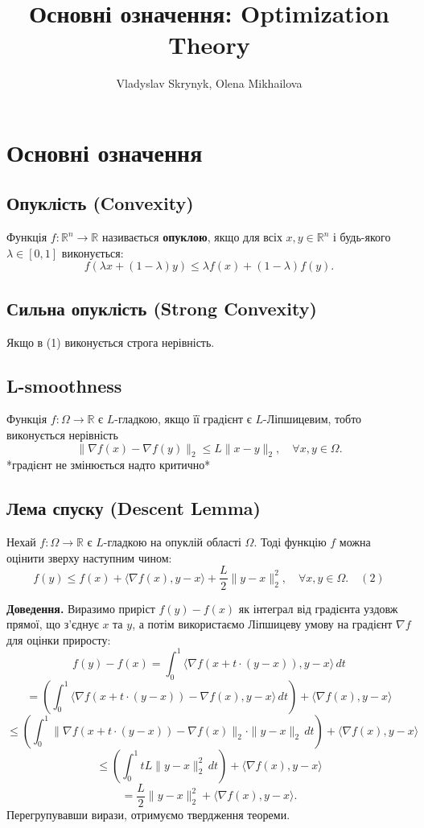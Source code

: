 \documentclass[a4paper,12pt]{article}
\title{Основні означення: Optimization Theory}
\author{Vladyslav Skrynyk, Olena Mikhailova}
\begin{document}
\maketitle

\section{Основні означення}

\subsection{Опуклість (Convexity)}
Функція $f: \mathbb{R}^n \to \mathbb{R}$ називається \textbf{опуклою}, якщо для всіх $x, y \in \mathbb{R}^n$ і будь-якого $\lambda \in [0,1]$ виконується:
\[
    f(\lambda x + (1 - \lambda)y) \leq \lambda f(x) + (1 - \lambda) f(y). \tag{1}
\]
\subsection{Сильна опуклість (Strong Convexity)}
Якщо в (1) виконується строга нерівність.

\subsection{L-smoothness}
Функція \( f: \Omega \to \mathbb{R} \) є \( L \)-гладкою, якщо її градієнт є 
\( L \)-Ліпшицевим, тобто виконується нерівність  
\[
\|\nabla f(x) - \nabla f(y)\|_2 \leq L \|x - y\|_2, \quad \forall x, y \in \Omega.
\]
*градієнт не змінюється надто критично*

\subsection{Лема спуску (Descent Lemma)}
Нехай \( f: \Omega \to \mathbb{R} \) є \( L \)-гладкою на опуклій області \( \Omega \).  
Тоді функцію \( f \) можна оцінити зверху наступним чином:
\[
f(y) \leq f(x) + \langle \nabla f(x), y - x \rangle + \frac{L}{2} \|y - x\|_2^2, \quad \forall x, y \in \Omega. \quad (2)
\]
  
\textbf{Доведення.} Виразимо приріст \( f(y) - f(x) \) як інтеграл від градієнта уздовж прямої, що з'єднує \( x \) та \( y \),  
а потім використаємо Ліпшицеву умову на градієнт \( \nabla f \) для оцінки приросту:
\[
f(y) - f(x) = \int_0^1 \langle \nabla f(x + t \cdot (y - x)), y - x \rangle \, dt
\]
\[
= \left( \int_0^1 \langle \nabla f(x + t \cdot (y - x)) - \nabla f(x), y - x \rangle \, dt \right) + \langle \nabla f(x), y - x \rangle
\]
\[
\leq \left( \int_0^1 \|\nabla f(x + t \cdot (y - x)) - \nabla f(x)\|_2 \cdot \|y - x\|_2 \, dt \right) + \langle \nabla f(x), y - x \rangle
\]
\[
\leq \left( \int_0^1 t L \|y - x\|_2^2 \, dt \right) + \langle \nabla f(x), y - x \rangle
\]
\[
= \frac{L}{2} \|y - x\|_2^2 + \langle \nabla f(x), y - x \rangle.
\]
Перегрупувавши вирази, отримуємо твердження теореми.
\end{document}
